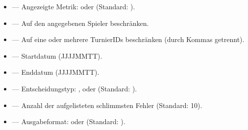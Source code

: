 \documentclass[letterpaper,10pt,german]{sphinxmanual}
\begin{document}
\sphinxAtStartPar
{}
\begin{itemize}
\item {} 
\sphinxAtStartPar
{} — Angezeigte Metrik:  oder  (Standard: ).

\item {} 
\sphinxAtStartPar
{} — Auf den angegebenen Spieler beschränken.

\item {} 
\sphinxAtStartPar
{} — Auf eine oder mehrere Turnier\sphinxhyphen{}IDs beschränken (durch Kommas getrennt).

\item {} 
\sphinxAtStartPar
{} — Startdatum (JJJJ\sphinxhyphen{}MM\sphinxhyphen{}TT).

\item {} 
\sphinxAtStartPar
{} — Enddatum (JJJJ\sphinxhyphen{}MM\sphinxhyphen{}TT).

\item {} 
\sphinxAtStartPar
{} — Entscheidungstyp: ,  oder  (Standard: ).

\item {} 
\sphinxAtStartPar
{} — Anzahl der aufgelisteten schlimmsten Fehler (Standard: 10).

\item {} 
\sphinxAtStartPar
{} — Ausgabeformat:  oder  (Standard: ).

\end{itemize}

\sphinxAtStartPar
{}
\end{document}
